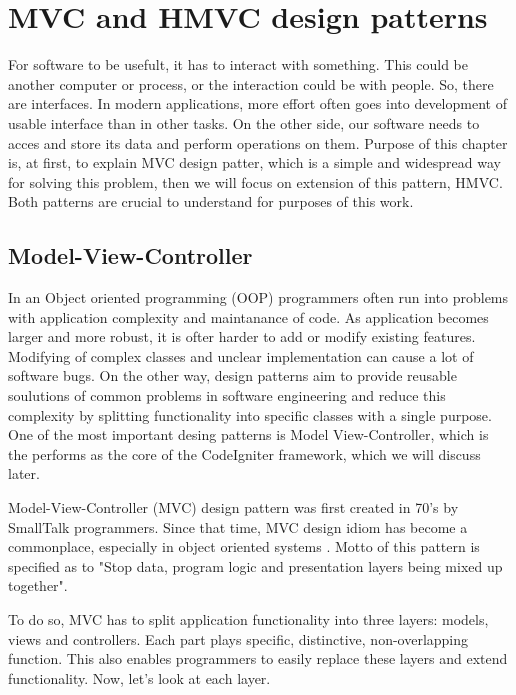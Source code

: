\chapter{MVC and HMVC design patterns}

\label{kap:courses} %


For software to be usefult, it has to interact with something. This could be another computer or process, or the interaction could be with people. So, there are interfaces. In modern applications, more effort often goes into development of usable interface than in other tasks. On the other side, our software needs to acces and store its data and perform operations on them. Purpose of this chapter is, at first, to explain MVC design patter, which is a simple and widespread way for solving this problem, then we will focus on extension of this pattern, HMVC. Both patterns are crucial to understand for purposes of this work.

\section{Model-View-Controller}

In an Object oriented programming (OOP) programmers often run into problems with application complexity and maintanance of code. As application becomes larger and more robust, it is ofter harder to add or modify existing features. Modifying of complex classes and unclear implementation can cause a lot of software bugs. On the other way, design patterns aim to provide reusable soulutions of common problems in software engineering and reduce this complexity by splitting functionality into specific classes with a single purpose. One of the most important desing patterns is Model View-Controller, which is the performs as the core of the CodeIgniter framework, which we will discuss later.


Model-View-Controller (MVC) design pattern was first created in 70’s by SmallTalk programmers. Since that time, MVC design idiom has become a commonplace, especially in object oriented systems \cite{deacon2009model}. Motto of this pattern is specified as to "Stop data, program logic and presentation layers being mixed up together".


To do so, MVC has to split application functionality into three layers: models, views and controllers. Each part plays specific, distinctive, non-overlapping function. This also enables programmers to easily replace these layers and extend functionality. Now, let's look at each layer.

